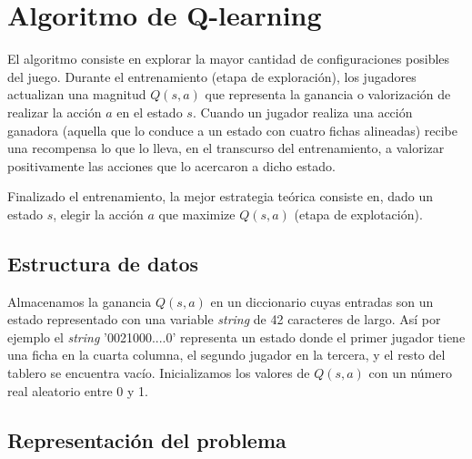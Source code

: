\documentclass[11pt, spanish]{article}
\begin{document}
\section{Algoritmo de Q-learning}

\par El algoritmo consiste en explorar la mayor cantidad de configuraciones 
posibles del juego. Durante el entrenamiento (etapa de exploración), los 
jugadores actualizan una magnitud $Q(s,a)$ que representa la ganancia o 
valorización de realizar la acción $a$ en el estado $s$. Cuando un jugador 
realiza una acción ganadora (aquella que lo conduce a un estado con cuatro 
fichas alineadas) recibe una recompensa lo que lo lleva, en el 
transcurso del entrenamiento, a valorizar positivamente las 
acciones que lo acercaron a dicho estado. 
\par Finalizado el entrenamiento, la mejor estrategia teórica consiste en, dado 
un estado $s$, elegir la acción $a$ que maximize $Q(s,a)$ (etapa de 
explotación).

\subsection{Estructura de datos}

\par Almacenamos la ganancia $Q(s,a)$ en un diccionario cuyas entradas son un 
estado representado con una variable \emph{string} de 42 caracteres de largo. 
Así por ejemplo el \emph{string} '0021000....0' representa un estado donde 
el primer jugador tiene una ficha en la cuarta columna, el segundo jugador en 
la tercera, y el resto del tablero se encuentra vacío. Inicializamos los valores 
de $Q(s,a)$ con un número real aleatorio entre 0 y 1.

\subsection{Representación del problema}
\end{document}
